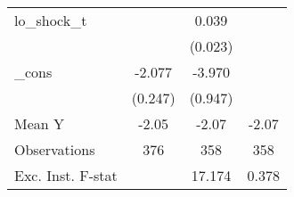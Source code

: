{\begin{tabular}{l*{3}{c}}
\addlinespace
lo\_shock\_t  &                     &       0.039         &                     \\
            &                     &     (0.023)         &                     \\
\addlinespace
\_cons      &      -2.077\sym{***}&      -3.970\sym{***}&                     \\
            &     (0.247)         &     (0.947)         &                     \\
\midrule
Mean Y      &       -2.05         &       -2.07         &       -2.07         \\
Observations&         376         &         358         &         358         \\
Exc. Inst. F-stat&                     &      17.174         &       0.378         \\
\bottomrule
\end{tabular}
}
